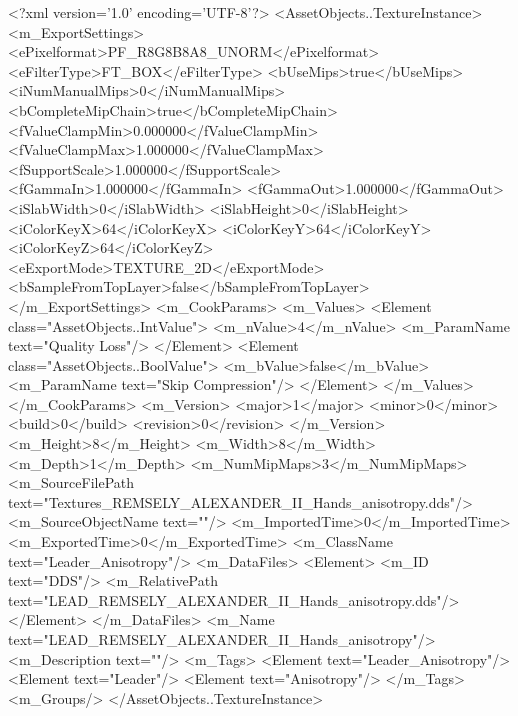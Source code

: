 <?xml version='1.0' encoding='UTF-8'?>
<AssetObjects..TextureInstance>
  <m_ExportSettings>
    <ePixelformat>PF_R8G8B8A8_UNORM</ePixelformat>
    <eFilterType>FT_BOX</eFilterType>
    <bUseMips>true</bUseMips>
    <iNumManualMips>0</iNumManualMips>
    <bCompleteMipChain>true</bCompleteMipChain>
    <fValueClampMin>0.000000</fValueClampMin>
    <fValueClampMax>1.000000</fValueClampMax>
    <fSupportScale>1.000000</fSupportScale>
    <fGammaIn>1.000000</fGammaIn>
    <fGammaOut>1.000000</fGammaOut>
    <iSlabWidth>0</iSlabWidth>
    <iSlabHeight>0</iSlabHeight>
    <iColorKeyX>64</iColorKeyX>
    <iColorKeyY>64</iColorKeyY>
    <iColorKeyZ>64</iColorKeyZ>
    <eExportMode>TEXTURE_2D</eExportMode>
    <bSampleFromTopLayer>false</bSampleFromTopLayer>
  </m_ExportSettings>
  <m_CookParams>
    <m_Values>
      <Element class="AssetObjects..IntValue">
        <m_nValue>4</m_nValue>
        <m_ParamName text="Quality Loss"/>
      </Element>
      <Element class="AssetObjects..BoolValue">
        <m_bValue>false</m_bValue>
        <m_ParamName text="Skip Compression"/>
      </Element>
    </m_Values>
  </m_CookParams>
  <m_Version>
    <major>1</major>
    <minor>0</minor>
    <build>0</build>
    <revision>0</revision>
  </m_Version>
  <m_Height>8</m_Height>
  <m_Width>8</m_Width>
  <m_Depth>1</m_Depth>
  <m_NumMipMaps>3</m_NumMipMaps>
  <m_SourceFilePath text="Textures\LEAD_REMSELY_ALEXANDER_II_Hands_anisotropy.dds"/>
  <m_SourceObjectName text=""/>
  <m_ImportedTime>0</m_ImportedTime>
  <m_ExportedTime>0</m_ExportedTime>
  <m_ClassName text="Leader_Anisotropy"/>
  <m_DataFiles>
    <Element>
      <m_ID text="DDS"/>
      <m_RelativePath text="LEAD_REMSELY_ALEXANDER_II_Hands_anisotropy.dds"/>
    </Element>
  </m_DataFiles>
  <m_Name text="LEAD_REMSELY_ALEXANDER_II_Hands_anisotropy"/>
  <m_Description text=""/>
  <m_Tags>
    <Element text="Leader_Anisotropy"/>
    <Element text="Leader"/>
    <Element text="Anisotropy"/>
  </m_Tags>
  <m_Groups/>
</AssetObjects..TextureInstance>
